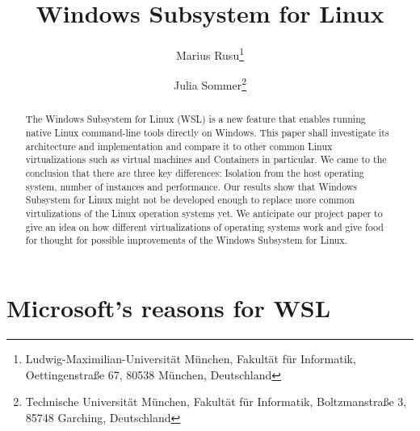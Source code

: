 \documentclass[utf8,biblatex, ngerman, english]{lni}
\begin{document}
\title[WSL]{Windows Subsystem for Linux}
\author[Marius Rusu \and Julia Sommer]
{Marius Rusu\footnote{Ludwig-Maximilian-Universität München, Fakultät für Informatik, Oettingenstraße 67, 80538 München, Deutschland } \and
 Julia Sommer\footnote{Technische Universität München, Fakultät für Informatik, Boltzmanstraße 3, 85748 Garching, Deutschland }}
\maketitle
\newpage
\tableofcontents
\newpage

\begin{abstract}
The Windows Subsystem for Linux (WSL) is a new feature that enables running native Linux command-line tools directly on Windows. This paper shall investigate its architecture and implementation and compare it to other common Linux virtualizations such as virtual machines and Containers in particular. We came to the conclusion that there are three key differences: Isolation from the host operating system, number of instances and performance. Our results show that Windows Subsystem for Linux might not be developed enough to replace more common virtulizations of the Linux operation systems yet. We anticipate our project paper to give an idea on how different virtualizations of operating systems work and give food for thought for possible improvements of the Windows Subsystem for Linux. 
\end{abstract}


\section{Microsoft's reasons for WSL}
\end{document}
